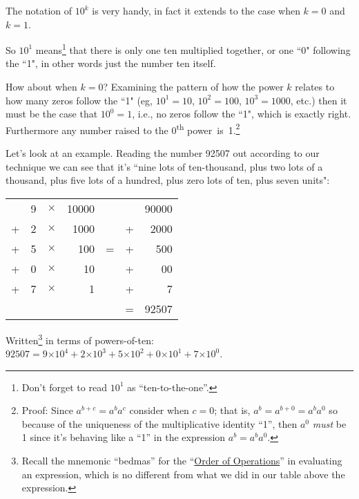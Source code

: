 \documentclass{article}
\begin{document}
The notation of $10^k$ is very handy, in fact it extends
to the case when $k=0$ and $k=1$.

So $10^1$ means\footnote{Don't forget to read $10^1$ as ``ten-to-the-one''.} that there is only one ten multiplied together, or one ``0" following the ``1",
in other words just the number ten itself.

How about when $k=0$?
Examining the pattern of how the power $k$ relates to how many zeros follow the ``1"
(eg, $10^1=10$, $10^2=100$, $10^3=1000$,
etc.) then it must be the case that $10^0=1$,
i.e., no zeros follow the ``1", which is exactly right.
Furthermore any number raised to the 0\textsuperscript{th} power~is~1.\footnote{Proof: Since $a^{b+c}=a^ba^c$ consider when $c=0$; that is,
 $a^b=a^{b+0}=a^ba^0$ so because of the uniqueness of the multiplicative identity ``1'', then $a^0$ \emph{must} be 1 since it's behaving 
 like a ``1'' in the expression $a^b=a^ba^0$.}

Let's look at an example.
Reading the number 92507 out according to our technique we can see
that it's ``nine lots of ten-thousand,
plus two lots of a thousand, plus five lots of a hundred,
plus zero lots of ten, plus seven units":

\begin{center}
\begin{tabular}{r r r r c r r}
\phantom & 9 & $\times$ & 10000 & \phantom & \phantom & 90000\\
+ & 2 & $\times$ & 1000 & \phantom & + & 2000\\
+ & 5 & $\times$ & 100 & \; \; = \; \; & + & 500\\
+ & 0 & $\times$ & 10 & \phantom & + & 00\\
+ & 7 & $\times$ & 1 & \phantom & + & 7\\
\cline{6-7}
\phantom & \phantom & \phantom & \phantom & \phantom & = & 92507
\end{tabular}
\end{center}

Written\footnote{Recall the mnemonic ``bedmas'' for the ``\href{https://en.wikipedia.org/wiki/Order_of_operations}{Order of Operations}'' in
evaluating an expression, which is no different from what we did in our table above the expression.}
in terms of powers-of-ten: $92507=9{\times{}}10^4+2{\times{}}10^3+5{\times{}}10^2+0{\times{}}10^1+7{\times{}}10^0$.
\end{document}
